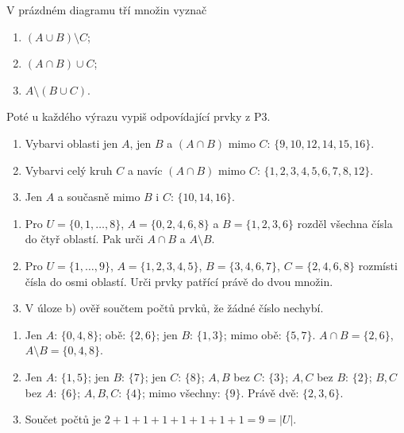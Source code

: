 \documentclass[11pt,a4paper]{article}
\begin{document}

\begin{zadaniReseniBox}[title={Rozšíření 1}]
V prázdném diagramu tří množin vyznač
\begin{enumerate}[label=\alph*)]
\item $(A\cup B)\setminus C$;
\item $(A\cap B)\cup C$;
\item $A\setminus(B\cup C)$.
\end{enumerate}
Poté u každého výrazu vypiš odpovídající prvky z P3.
\tcblower
\begin{enumerate}[label=\alph*)]
\item Vybarvi oblasti jen $A$, jen $B$ a $(A\cap B)$ mimo $C$:
$\{9,10,12,14,15,16\}$.
\item Vybarvi celý kruh $C$ a navíc $(A\cap B)$ mimo $C$:
$\{1,2,3,4,5,6,7,8,12\}$.
\item Jen $A$ a současně mimo $B$ i $C$:
$\{10,14,16\}$.
\end{enumerate}
\end{zadaniReseniBox}

\begin{zadaniReseniBox}[title={Domácí úkol}]
\begin{enumerate}[label=\alph*)]
\item Pro $U=\{0,1,\ldots,8\}$, $A=\{0,2,4,6,8\}$
a $B=\{1,2,3,6\}$ rozděl všechna čísla do čtyř oblastí.
Pak urči $A\cap B$ a $A\setminus B$.
\item Pro $U=\{1,\ldots,9\}$,
$A=\{1,2,3,4,5\}$, $B=\{3,4,6,7\}$,
$C=\{2,4,6,8\}$ rozmísti čísla do osmi oblastí.
Urči prvky patřící právě do dvou množin.
\item V úloze b) ověř součtem počtů prvků, že žádné číslo nechybí.
\end{enumerate}
\tcblower
\begin{enumerate}[label=\alph*)]
\item Jen $A$: $\{0,4,8\}$; obě: $\{2,6\}$;
jen $B$: $\{1,3\}$; mimo obě: $\{5,7\}$.
$A\cap B=\{2,6\}$, $A\setminus B=\{0,4,8\}$.
\item Jen $A$: $\{1,5\}$; jen $B$: $\{7\}$;
jen $C$: $\{8\}$; $A,B$ bez $C$: $\{3\}$;
$A,C$ bez $B$: $\{2\}$; $B,C$ bez $A$: $\{6\}$;
$A,B,C$: $\{4\}$; mimo všechny: $\{9\}$.
Právě dvě: $\{2,3,6\}$.
\item Součet počtů je $2+1+1+1+1+1+1+1=9=|U|$.
\end{enumerate}
\end{zadaniReseniBox}
\end{document}
